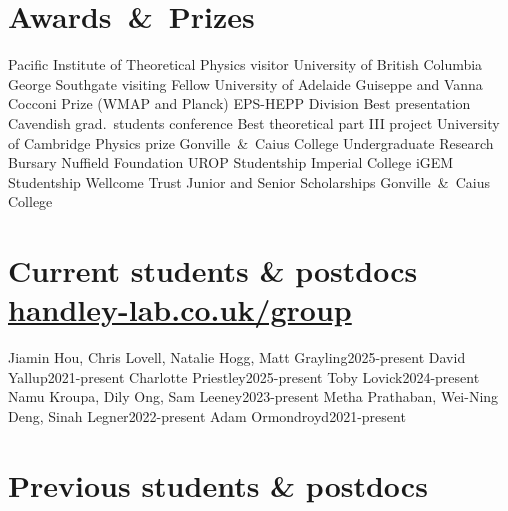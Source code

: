 \documentclass[11pt,a4paper,sans]{moderncv}
\begin{document}
\section{Awards~\&~Prizes}
  {Pacific Institute of Theoretical Physics visitor}         {University of British Columbia}
  {George Southgate visiting Fellow}         {University of Adelaide}
  {Guiseppe and Vanna Cocconi Prize (WMAP and Planck)}         {EPS-HEPP Division}
  {Best presentation}                 {Cavendish grad.\ students conference}
  {Best theoretical part III project} {University of Cambridge} 
\cvitemwithcomment{}            {Physics prize}                     {Gonville~\&~Caius College} 
 {Undergraduate Research Bursary}    {Nuffield Foundation}  
\cvitemwithcomment{}            {UROP Studentship}                  {Imperial College} 
 {iGEM Studentship}                  {Wellcome Trust} 
    {Junior and Senior Scholarships}    {Gonville~\&~Caius College} 

\pagebreak
\section{Current students \& postdocs \hfill\href{https://www.handley-lab.co.uk/group}{handley-lab.co.uk/group}}
  {Jiamin Hou, Chris Lovell, Natalie Hogg, Matt Grayling}{2025-present}
\cvitemwithcomment{}  {David Yallup}{2021-present}
 {Charlotte Priestley}{2025-present}
\cvitemwithcomment{} {Toby Lovick}{2024-present}
\cvitemwithcomment{} {Namu Kroupa, Dily Ong, Sam Leeney}{2023-present}
\cvitemwithcomment{} {Metha Prathaban, Wei-Ning Deng, Sinah Legner}{2022-present}
\cvitemwithcomment{}  {Adam Ormondroyd}{2021-present}

\section{Previous students \& postdocs}
\end{document}
